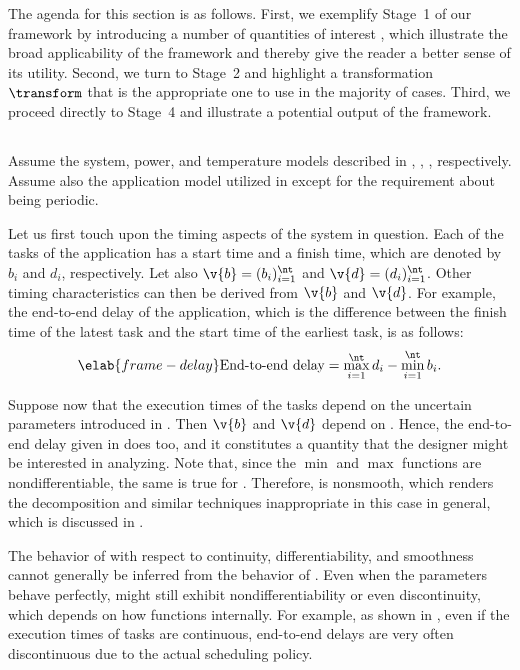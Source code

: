 The agenda for this section is as follows. First, we exemplify Stage~1 of our
framework by introducing a number of quantities of interest \g, which illustrate
the broad applicability of the framework and thereby give the reader a better
sense of its utility. Second, we turn to Stage~2 and highlight a transformation
$\transform$ that is the appropriate one to use in the majority of cases. Third,
we proceed directly to Stage~4 and illustrate a potential output of the
framework.

\subsection{\problemtitle}

Assume the system, power, and temperature models described in
, , , respectively.
Assume also the application model utilized in 
except for the requirement about being periodic.

Let us first touch upon the timing aspects of the system in question. Each of
the \nt tasks of the application has a start time and a finish time, which are
denoted by $b_i$ and $d_i$, respectively. Let also $\v{b} = (b_i)_{i = 1}^\nt$
and $\v{d} = (d_i)_{i = 1}^\nt$. Other timing characteristics can then be
derived from $\v{b}$ and $\v{d}$. For example, the end-to-end delay of the
application, which is the difference between the finish time of the latest task
and the start time of the earliest task, is as follows:
\begin{equation} \elab{frame-delay}
  \text{End-to-end delay}
  = \max_{i = 1}^\nt d_i - \min_{i = 1}^\nt b_i.
\end{equation}

Suppose now that the execution times of the tasks depend on the uncertain
parameters \vu introduced in . Then $\v{b}$ and $\v{d}$
depend on \vu. Hence, the end-to-end delay given in  does too,
and it constitutes a quantity \g that the designer might be interested in
analyzing. Note that, since the $\min$ and $\max$ functions are
nondifferentiable, the same is true for \g. Therefore, \g is nonsmooth, which
renders the  decomposition and similar techniques inappropriate in this
case in general, which is discussed in .

\begin{remark} 
The behavior of \g with respect to continuity, differentiability, and smoothness
cannot generally be inferred from the behavior of \vu. Even when the parameters
behave perfectly, \g might still exhibit nondifferentiability or even
discontinuity, which depends on how \g functions internally. For example, as
shown in \cite{tanasa2015}, even if the execution times of tasks are continuous,
end-to-end delays are very often discontinuous due to the actual scheduling
policy.
\end{remark}

